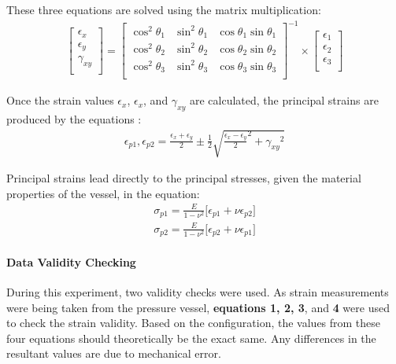 \documentclass{article}
\begin{document}
These three equations are solved using the matrix multiplication: 
\begin{align}
\begin{bmatrix}
\epsilon_x \\
\epsilon_y \\
\gamma_{xy} \\
\end{bmatrix}
= 
\begin{bmatrix}
   \cos^{2}\theta_1 & \sin^{2}\theta_1 & \cos{\theta_1}\sin{\theta_1}  \\
   \cos^{2}\theta_2 & \sin^{2}\theta_2 & \cos{\theta_2}\sin{\theta_2}  \\
   \cos^{2}\theta_3 & \sin^{2}\theta_3 & \cos{\theta_3}\sin{\theta_3}  \\
\end{bmatrix}^{-1} \times
\begin{bmatrix}
\epsilon_1 \\
\epsilon_2 \\
\epsilon_3 \\
\end{bmatrix}
\end{align}

Once the strain values $\epsilon_x$, $\epsilon_x$, and $\gamma_{xy}$ are calculated, the principal strains
are produced by the equations :
\begin{align}
\epsilon_{p1}, \epsilon_{p2} = \frac{\epsilon_x + \epsilon_y}{2} \pm
\frac{1}{2} \sqrt{ { \frac{\epsilon_x - \epsilon_y}{2}}^2 + {\gamma_{xy}}^2 }
\end{align}


Principal strains lead directly to the principal stresses, given the material properties of the vessel,
in the equation:
\begin{align}
\sigma_{p1} = \frac{E}{1-\nu^2} \big[ \epsilon_{p1} + \nu\epsilon_{p2} \big] \\
\sigma_{p2} = \frac{E}{1-\nu^2} \big[ \epsilon_{p2} + \nu\epsilon_{p1} \big]
\end{align}
	
\paragraph {Data Validity Checking} 
During this experiment, two validity checks were used. As strain measurements were being taken from
the pressure vessel, \textbf{equations 1, 2, 3}, and \textbf{4} were used to check the strain validity. 
Based on the configuration, the values from these four equations should theoretically be the exact same. 
Any differences in the resultant values are due to mechanical error. \\ 
\end{document}
